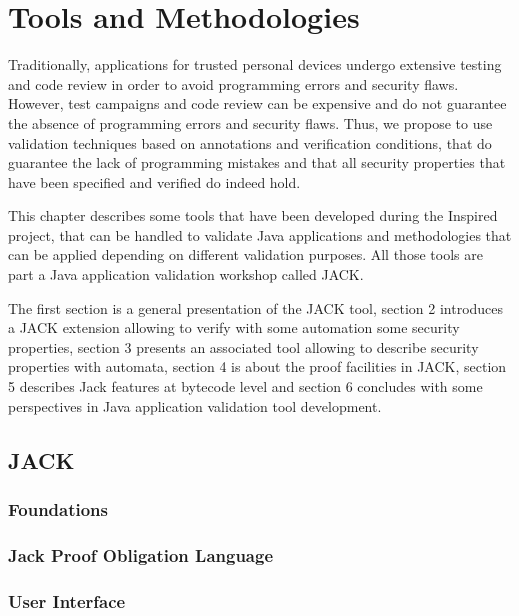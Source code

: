 \chapter{Tools and Methodologies}
Traditionally, applications for trusted personal devices undergo
extensive testing and code review in order to avoid programming 
errors and security flaws. However, test campaigns and code review
can be expensive and do not guarantee the absence of programming
errors and security flaws. Thus, we propose to use validation
techniques based on annotations and verification conditions,
that do guarantee the lack of programming mistakes and that
all security properties that have been specified and verified
do indeed hold.



This chapter describes some tools that have been developed during the
Inspired project, that can be handled to validate Java applications
and methodologies that can be applied depending on different
validation purposes.  All those tools are part a Java application
validation workshop called JACK.


The first section is a general presentation of the JACK tool, section
2 introduces a JACK extension allowing to verify with some automation
some security properties, section 3 presents an associated tool
allowing to describe security properties with automata, section 4 is
about the proof facilities in JACK, section 5 describes Jack features
at bytecode level and section 6 concludes with some perspectives in
Java application validation tool development.

\section{JACK}

\subsection{Foundations}

\subsection{Jack Proof Obligation Language}

\subsection{User Interface}

%
%

